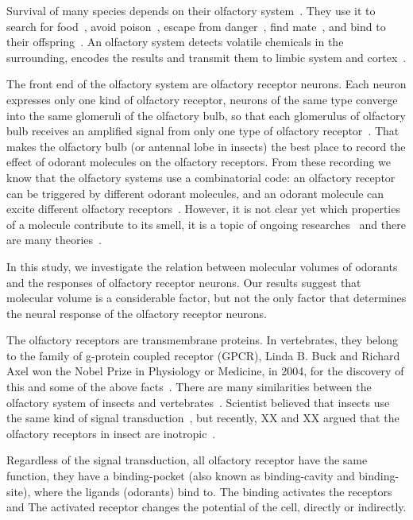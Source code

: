 \documentclass[11pt]{paper} %
\begin{document}
Survival of many species depends on their olfactory system~\cite{}. 
They use it  to search for food~\cite{}, 
avoid poison~\cite{}, 
escape from danger~\cite{}, 
find mate~\cite{}, 
and bind to their offspring~\cite{}.
An olfactory system detects volatile chemicals in the surrounding, 
encodes the results and transmit them to limbic system and cortex~\cite{}.

The front end of the olfactory system are olfactory receptor neurons. 
Each neuron expresses only one kind of olfactory receptor, 
neurons of the same type converge into the same glomeruli of the olfactory bulb,
so that each glomerulus of olfactory bulb receives an amplified signal from only one type of olfactory receptor~\cite{}.
That makes the olfactory bulb (or antennal lobe in insects) the best place to record the effect of odorant molecules on the olfactory receptors. 
From these recording we know that the olfactory systems use a combinatorial code: 
an olfactory receptor can be triggered by different odorant molecules, 
and an odorant molecule can excite different olfactory receptors~\cite{Malnic2000}.  
However, it is not clear yet which properties of a molecule contribute to its smell,
it is a topic of ongoing researches~\cite{} and there are many theories~\cite{}.

In this study, 
we investigate the relation between molecular volumes of odorants and the responses of olfactory receptor neurons. 
Our results suggest that molecular volume is a considerable factor, but not the only factor that determines the neural response of the olfactory receptor neurons.


The olfactory receptors are transmembrane proteins.
In vertebrates, they belong to the family of g-protein coupled receptor (GPCR), 
Linda B. Buck and Richard Axel won the Nobel Prize in Physiology or Medicine, in 2004, 
for the discovery of this and some of the above facts~\cite{Buck1991}.
There are many similarities between the olfactory system of insects and vertebrates~\cite{Kaupp2010}.
Scientist believed that insects use the same kind of signal transduction~\cite{}, 
but recently, XX and XX argued that the olfactory receptors in insect are inotropic~\cite{Sato2008,Wicher2008}. 

Regardless of the signal transduction, 
all olfactory receptor have the same function, they have a binding-pocket (also known as binding-cavity and binding-site),
where the ligands (odorants) bind to. 
The binding activates the receptors and
The activated receptor changes the potential of the cell, directly or indirectly.
\end{document}

